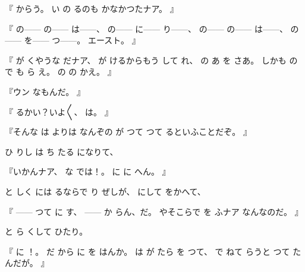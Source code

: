 『
からう。
い
の
るのも
かなかつたナア。
』

『
の------
の------
は------、
の------
に------
り------、
の------
の------
は------、
の------
を------
つ------。
エースト。
』

『
が
くやうな
だナア、
が
けるからもう
して%
れ、
の
あ
を
さあ。
しかも
の
で
も
ら
え。
の
の
かえ。
』

『ウン
なもんだ。
』

『
るかい？いよ〳〵、
は。
』

『そんな
は
よりは
なんぞの%
が
つて
つて
るといふことだぞ。
』

ひ
りし
は
ち
たる
になりて、

『いかんナア、
な
では！。
に
に
へん。
』

と
しく
には
るならで
り
ぜしが、
にして
をかへて、

『
------
つて
に
す、
------
か
らん、だ。
やそこらで
を
ふナア
なんなのだ。
』

と
ら
くして
ひたり。

『
に
！。
だ
から
に
を
はんか。
は
が
たら
を
つて、
で
ねて
らうと
つて
たんだが。
』

